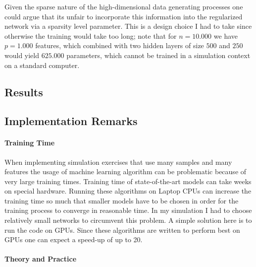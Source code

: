 \begin{remark}
Given the sparse nature of the high-dimensional data generating processes one could
argue that its unfair to incorporate this information into the regularized network via
a sparsity level parameter. This is a design choice I had to take since otherwise the
training would take too long; note that for $n = 10.000$ we have $p = 1.000$ features,
which combined with two hidden layers of size $500$ and $250$ would yield $625.000$
parameters, which cannot be trained in a simulation context on a standard computer.
\end{remark}

\subsection{Results}

\subsection*{Implementation Remarks}

\paragraph{Training Time}

When implementing simulation exercises that use many samples and many features the usage
of machine learning algorithm can be problematic because of very large training times.
Training time of state-of-the-art models can take weeks on special hardware. Running
these algorithms on Laptop CPUs can increase the training time so much that smaller
models have to be chosen in order for the training process to converge in reasonable
time. In my simulation I had to choose relatively small networks to circumvent this
problem. A simple solution here is to run the code on GPUs. Since these algorithms are
written to perform best on GPUs one can expect a speed-up of up to 20.

\paragraph{Theory and Practice}

